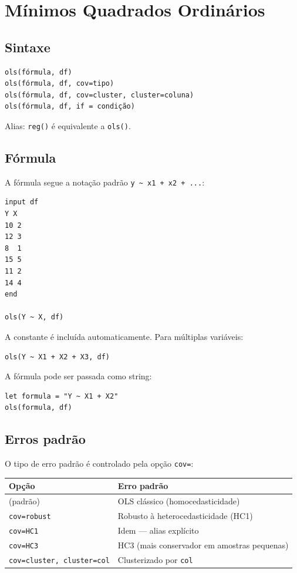 \chapter{Mínimos Quadrados Ordinários}
\label{cap:ols}

\section{Sintaxe}

\begin{lstlisting}
ols(fórmula, df)
ols(fórmula, df, cov=tipo)
ols(fórmula, df, cov=cluster, cluster=coluna)
ols(fórmula, df, if = condição)
\end{lstlisting}

Alias: \lstinline{reg()} é equivalente a \lstinline{ols()}.

\section{Fórmula}

A fórmula segue a notação padrão \texttt{y \textasciitilde{} x1 + x2 + ...}:

\begin{lstlisting}[caption={OLS básico}]
input df
Y X
10 2
12 3
8  1
15 5
11 2
14 4
end

ols(Y ~ X, df)
\end{lstlisting}

A constante é incluída automaticamente. Para múltiplas variáveis:

\begin{lstlisting}
ols(Y ~ X1 + X2 + X3, df)
\end{lstlisting}

A fórmula pode ser passada como string:

\begin{lstlisting}
let formula = "Y ~ X1 + X2"
ols(formula, df)
\end{lstlisting}

\section{Erros padrão}

O tipo de erro padrão é controlado pela opção \lstinline{cov=}:

\begin{center}
\begin{tabular}{ll}
\toprule
\textbf{Opção} & \textbf{Erro padrão} \\
\midrule
(padrão)              & OLS clássico (homocedasticidade) \\
\texttt{cov=robust}   & Robusto à heterocedasticidade (HC1) \\
\texttt{cov=HC1}      & Idem — alias explícito \\
\texttt{cov=HC3}      & HC3 (mais conservador em amostras pequenas) \\
\texttt{cov=cluster, cluster=col}  & Clusterizado por \texttt{col} \\
\bottomrule
\end{tabular}
\end{center}


